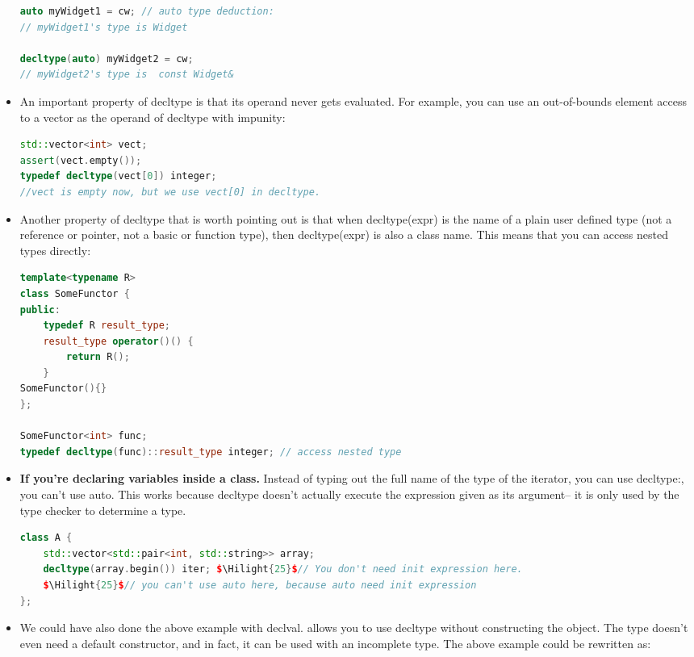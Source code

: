 \documentclass[a4paper,11pt,twoside]{book}
\newcommand{\Hilight}[1]{\makebox[0pt][l]{\color{yellow}\rule[-3pt]{#1em}{11pt}}}
\newcommand{\Hilight}[1]{}
\begin{document}
\begin{itemize}
\begin{lstlisting}[frame=single, language=c++, mathescape=true]
auto myWidget1 = cw; // auto type deduction:
// myWidget1's type is Widget
	
decltype(auto) myWidget2 = cw;
// myWidget2's type is  const Widget&
\end{lstlisting}
	
	\item An important property of decltype is that its operand never gets evaluated. For example, you can use an out-of-bounds element access to a vector as the operand of decltype with impunity:
	
\begin{lstlisting}[frame=single, language=c++, mathescape=true]
std::vector<int> vect;
assert(vect.empty());
typedef decltype(vect[0]) integer; 
//vect is empty now, but we use vect[0] in decltype.
\end{lstlisting}
	
	\item Another property of decltype that is worth pointing out is that when decltype(expr) is the name of a plain user defined type (not a reference or pointer, not a basic or function type), then decltype(expr) is also a class name. This means that you can access nested types directly:
\begin{lstlisting}[frame=single, language=c++, mathescape=true]
template<typename R>
class SomeFunctor {
public:
	typedef R result_type;
	result_type operator()() {
		return R();
	}
SomeFunctor(){}
};

SomeFunctor<int> func;
typedef decltype(func)::result_type integer; // access nested type
\end{lstlisting}
	
	\item  \textbf{If you're declaring variables inside a class.} Instead of typing out the full name of the type of the iterator, you can use decltype:, you can't use auto.  This works because decltype doesn't actually execute the expression given as its argument-- it is only used by the type checker to determine a type.
\begin{lstlisting}[frame=single, language=c++, mathescape=true]
class A {
	std::vector<std::pair<int, std::string>> array;
	decltype(array.begin()) iter; $\Hilight{25}$// You don't need init expression here.
	$\Hilight{25}$// you can't use auto here, because auto need init expression
};
\end{lstlisting}
	
	\item We could have also done the above example with declval. allows you to use decltype without constructing the object. The type doesn't even need a default constructor, and in fact, it can be used with an incomplete type. The above example could be rewritten as:
	

\end{itemize}
\end{document}
